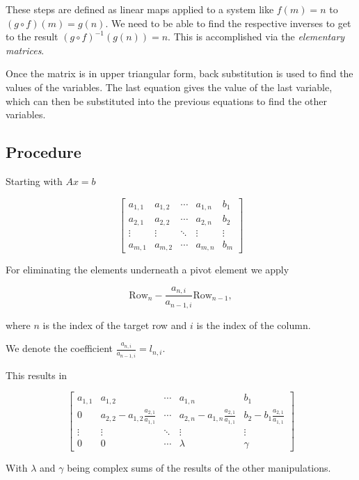 These steps are defined as linear maps applied to a system like \(f(m) = n\) to \((g \circ f)(m) = g(n)\). We need to be able to find the respective inverses 
to get to the result \((g \circ f)^{-1}({g(n)}) = n\). This is accomplished via the \emph{elementary matrices}.

Once the matrix is in upper triangular form, back substitution is used to find the values of the variables. The last equation gives the value of the last 
variable, which can then be substituted into the previous equations to find the other variables.

\subsection{Procedure}

Starting with \(Ax = b\)

\[  
    \left[
    \begin{array}{cccc|c}
        a_{1,1} &  a_{1,2} & \cdots & a_{1,n}  & b_1    \\
        a_{2,1} &  a_{2,2} & \cdots & a_{2,n}  & b_2    \\
        \vdots  &   \vdots & \ddots & \vdots   & \vdots \\
        a_{m,1} &  a_{m,2} & \cdots & a_{m,n}  & b_m
    \end{array}
    \right]
\]

For eliminating the elements underneath a pivot element we apply 

\[
    \text{Row}_n - \frac{a_{n, i}}{a_{n - 1, i}} \text{Row}_{n - 1},
\]

where \(n\) is the index of the target row and \(i\) is the index of the column.

We denote the coefficient \(\frac{a_{n, i}}{a_{n - 1, i}} = l_{n, i}\).

This results in

\[  
    \left[
    \begin{array}{cccc|c}
        a_{1,1} &  a_{1,2} & \cdots & a_{1,n}  & b_1    \\
        0 &  a_{2,2} - a_{1,2}\frac{a_{2,1}}{a_{1,1}} & \cdots & a_{2,n} - a_{1,n}\frac{a_{2,1}}{a_{1,1}}  & b_2 - b_1 \frac{a_{2,1}}{a_{1,1}}   \\
        \vdots  &   \vdots & \ddots & \vdots   & \vdots \\
        0 & 0  & \cdots & \lambda &  \gamma
    \end{array}
    \right]
\]

With \(\lambda\) and \(\gamma\) being complex sums of the results of the other manipulations.


